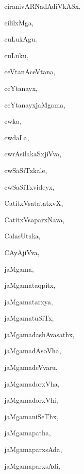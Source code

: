 \begin{multicols}{3}
{\noindent
{ciranivARNadAdiVkASx}, \pageref{ciranivARNadAdiVkASx}

\noindent
{cililxMga}, \pageref{cililxMga}

\noindent
{cuLukAgu}, \pageref{cuLukAgu}

\noindent
{cuLuku}, \pageref{cuLuku}

\noindent
{ceVtanAceVtana}, \pageref{ceVtanAceVtana}

\noindent
{ceYtanayx}, \pageref{ceYtanayx}

\noindent
{ceYtanayxjaMgama}, \pageref{ceYtanayxjaMgama}

\noindent
{cwka}, \pageref{cwka}

\noindent
{cwdaLa}, \pageref{cwdaLa}

\noindent
{cwrAsilakaSxjiVva}, \pageref{cwrAsilakaSxjiVva}

\noindent
{cwSaSiTxkale}, \pageref{cwSaSiTxkale}

\noindent
{cwSaSiTxvideyx}, \pageref{cwSaSiTxvideyx}

\noindent
{CatitxVsatatatxvX}, \pageref{CatitxVsatatatxvX}

\noindent
{CatitxVsaparxNava}, \pageref{CatitxVsaparxNava}

\noindent
{CalasUtaka}, \pageref{CalasUtaka}

\noindent
{CAyAjiVva}, \pageref{CAyAjiVva}

\noindent
{jaMgama}, \pageref{jaMgama}

\noindent
{jaMgamataqpitx}, \pageref{jaMgamataqpitx}

\noindent
{jaMgamatarxya}, \pageref{jaMgamatarxya}

\noindent
{jaMgamatuSiTx}, \pageref{jaMgamatuSiTx}

\noindent
{jaMgamadashAvasathx}, \pageref{jaMgamadashAvasathx}

\noindent
{jaMgamadAsoVha}, \pageref{jaMgamadAsoVha}

\noindent
{jaMgamadeVvaru}, \pageref{jaMgamadeVvaru}

\noindent
{jaMgamadorxVha}, \pageref{jaMgamadorxVha}

\noindent
{jaMgamadorxVhi}, \pageref{jaMgamadorxVhi}

\noindent
{jaMgamaniSeThx}, \pageref{jaMgamaniSeThx}

\noindent
{jaMgamapatha}, \pageref{jaMgamapatha}

\noindent
{jaMgamaparxsAda}, \pageref{jaMgamaparxsAda}

\noindent
{jaMgamaparxsAdi}, \pageref{jaMgamaparxsAdi}

}
\end{multicols}
